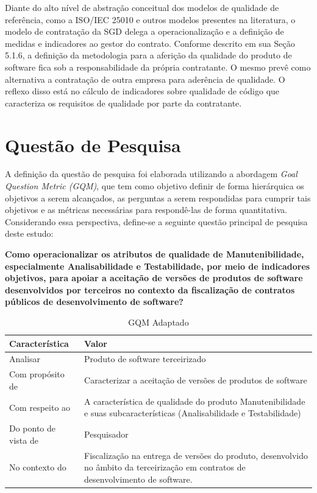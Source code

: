 Diante do alto nível de abstração conceitual dos modelos de qualidade de referência, como a ISO/IEC 25010 \cite{iso25000public} e outros modelos presentes na literatura, o modelo de contratação da SGD delega a operacionalização e a definição de medidas e indicadores ao gestor do contrato. Conforme descrito em sua Seção 5.1.6, a definição da metodologia para a aferição da qualidade do produto de software fica sob a responsabilidade da própria contratante. O mesmo prevê como alternativa a contratação de outra empresa para aderência de qualidade. O reflexo disso está no cálculo de indicadores sobre qualidade de código que caracteriza os requisitos de qualidade por parte da contratante.

\section{Questão de Pesquisa}

A definição da questão de pesquisa foi elaborada utilizando a abordagem \textit{Goal Question Metric (GQM)}, que tem como objetivo definir de forma hierárquica os objetivos a serem alcançados, as perguntas a serem respondidas para cumprir tais objetivos e as métricas necessárias para respondê-las de forma quantitativa. Considerando essa perspectiva, define-se a seguinte questão principal de pesquisa deste estudo:

\begin{center}
	\textbf{Como operacionalizar os atributos de qualidade de Manutenibilidade, especialmente Analisabilidade e Testabilidade, por meio de indicadores objetivos, para apoiar a aceitação de versões de produtos de software desenvolvidos por terceiros no contexto da fiscalização de contratos públicos de desenvolvimento de software?}
\end{center}

\begin{table}[!h]
    \centering
    \caption{GQM Adaptado}
    \label{tab-GQM}
    \begin{tabular}{l|p{10cm}}
        \hline
        \textbf{Característica} & \textbf{Valor} \\
        \hline
        Analisar & Produto de software terceirizado \\
		\hline
        Com propósito de & Caracterizar a aceitação de versões de produtos de software \\
		\hline
        Com respeito ao & A característica de qualidade do produto Manutenibilidade e suas subcaracterísticas (Analisabilidade e Testabilidade) \\
		\hline
		Do ponto de vista de & Pesquisador \\
		\hline
		No contexto do & Fiscalização na entrega de versões do produto, desenvolvido no âmbito da terceirização em contratos de desenvolvimento de software. \\
		\hline
    \end{tabular}
\end{table}



